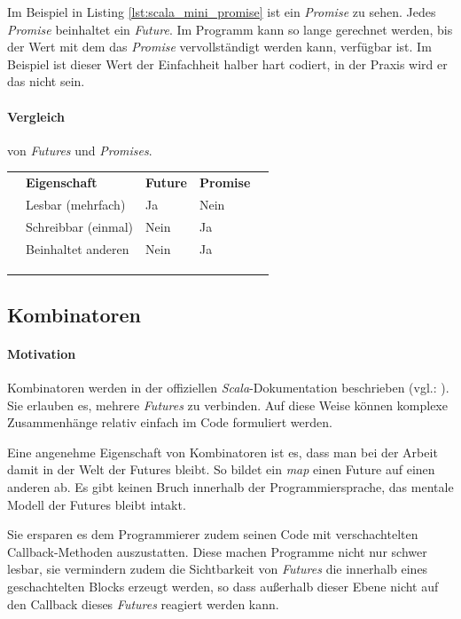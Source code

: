 Im Beispiel in Listing \ref{lst:scala_mini_promise} ist ein \emph{Promise} zu sehen.
Jedes \emph{Promise} beinhaltet ein \emph{Future}. Im Programm kann
so lange gerechnet werden, bis der Wert mit dem das \emph{Promise}
vervollständigt werden kann, verfügbar ist. Im Beispiel ist dieser
Wert der Einfachheit halber hart codiert, in der Praxis wird er das
nicht sein.

\paragraph{Vergleich} von \emph{Futures} und \emph{Promises}.

\begin{table}[h]
\begin{tabular}{lllll}
 & \textbf{Eigenschaft} & \textbf{Future} & \textbf{Promise} &  \\
 & Lesbar (mehrfach) & Ja & Nein &  \\
 & Schreibbar (einmal) & Nein & Ja &  \\
 & Beinhaltet anderen & Nein & Ja &  \\
 &  &  &  &  \\
 &  &  &  &  \\
 &  &  &  & 
\end{tabular}
\end{table}

\subsection{Kombinatoren}

\paragraph{Motivation} Kombinatoren werden in der offiziellen 
\emph{Scala}-Dokumentation beschrieben (vgl.: \cite{scalaDokuFP}).
Sie erlauben es, mehrere \emph{Futures} zu verbinden. 
Auf diese Weise können komplexe Zusammenhänge relativ einfach
im Code formuliert werden.

Eine angenehme Eigenschaft von Kombinatoren ist es, dass man bei
der Arbeit damit in der Welt der Futures bleibt. So bildet
ein \emph{map} einen Future auf einen anderen ab. Es gibt keinen
Bruch innerhalb der Programmiersprache, das mentale Modell der
Futures bleibt intakt.

Sie ersparen es dem Programmierer zudem seinen Code mit verschachtelten
Callback-Methoden auszustatten. Diese machen Programme nicht nur
schwer lesbar, sie vermindern zudem die Sichtbarkeit von \emph{Futures}
die innerhalb eines geschachtelten Blocks erzeugt werden, so dass
außerhalb dieser Ebene nicht auf den Callback dieses \emph{Futures}
reagiert werden kann.

